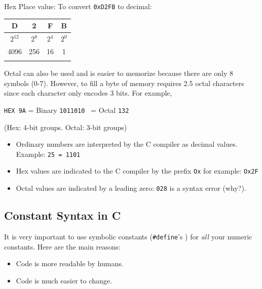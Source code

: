 \documentclass{article}	%
\begin{document}
Hex Place value: To convert {\tt 0xD2FB} to decimal:

\vspace{0.2in}	%
\begin{tabular}{|c|c|c|c|}
\hline
D       &       2       &       F       &       B \\ \hline
$2^{12}$        &       $2^8$   &       $2^4$   &       $2^0$ \\ \hline
4096    &       256     &       16      &       1 \\ \hline
        &               &               &          \\ \hline
\end{tabular}
\vspace{0.2in}	%

Octal
can also be used and is easier to memorize because there are
only 8 symbols (0-7). However, to fill
a byte of memory requires 2.5 octal characters since each
character only encodes 3 bits.  For example,

{\tt HEX 9A}  = Binary {\tt 1011010 } = Octal {\tt 132}

(Hex: 4-bit groups.   Octal: 3-bit groups)



\begin{itemize}
  \item
  Ordinary numbers are interpreted by the C compiler
          as decimal values.   Example: {\tt 25 = 1101}

  \item Hex values are indicated to the C compiler by the
              prefix {\tt Ox} for example:   {\tt Ox2F}

  \item Octal values are indicated by a leading zero: {\tt 028}
            is a syntax error (why?).

\end{itemize}



\subsection{Constant Syntax in C}

It is very important to use symbolic constants ({\tt \#define}'s )
for {\em all} your numeric constants.  Here are the
main reasons:
\begin{itemize}
        \item Code is more readable by humans.
        \item Code is much easier to change.
\end{itemize}
\end{document}
